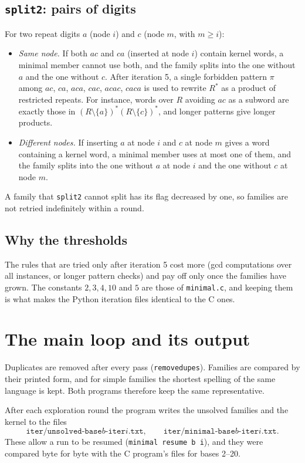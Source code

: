 \documentclass[11pt]{article}
\theoremstyle{definition}
\theoremstyle{remark}
\newcommand{\code}[1]{\texttt{#1}}
\begin{document}
\subsection{\code{split2}: pairs of digits}
For two repeat digits $a$ (node $i$) and $c$ (node $m$, with $m\ge i$):
\begin{itemize}
\item \emph{Same node.} If both $ac$ and $ca$ (inserted at node $i$) contain kernel words, a minimal member cannot use both, and the family splits into the one without $a$ and the one without $c$. After iteration 5, a single forbidden pattern $\pi$ among $ac$, $ca$, $aca$, $cac$, $acac$, $caca$ is used to rewrite $R^*$ as a product of restricted repeats. For instance, words over $R$ avoiding $ac$ as a subword are exactly those in $(R\setminus\{a\})^*(R\setminus\{c\})^*$, and longer patterns give longer products.
\item \emph{Different nodes.} If inserting $a$ at node $i$ and $c$ at node $m$ gives a word containing a kernel word, a minimal member uses at most one of them, and the family splits into the one without $a$ at node $i$ and the one without $c$ at node $m$.
\end{itemize}
A family that \code{split2} cannot split has its flag decreased by one, so families are not retried indefinitely within a round.

\subsection{Why the thresholds}
The rules that are tried only after iteration 5 cost more (gcd computations over all instances, or longer pattern checks) and pay off only once the families have grown. The constants $2,3,4,10$ and $5$ are those of \code{minimal.c}, and keeping them is what makes the Python iteration files identical to the C ones.

\section{The main loop and its output}

Duplicates are removed after every pass (\code{removedupes}). Families are compared by their printed form, and for simple families the shortest spelling of the same language is kept. Both programs therefore keep the same representative.

After each exploration round the program writes the unsolved families and the kernel to the files
\[
  \code{iter/unsolved-base}b\code{-iter}i\code{.txt},\qquad \code{iter/minimal-base}b\code{-iter}i\code{.txt}.
\]
These allow a run to be resumed (\code{minimal resume b i}), and they were compared byte for byte with the C program's files for bases 2--20.
\end{document}
